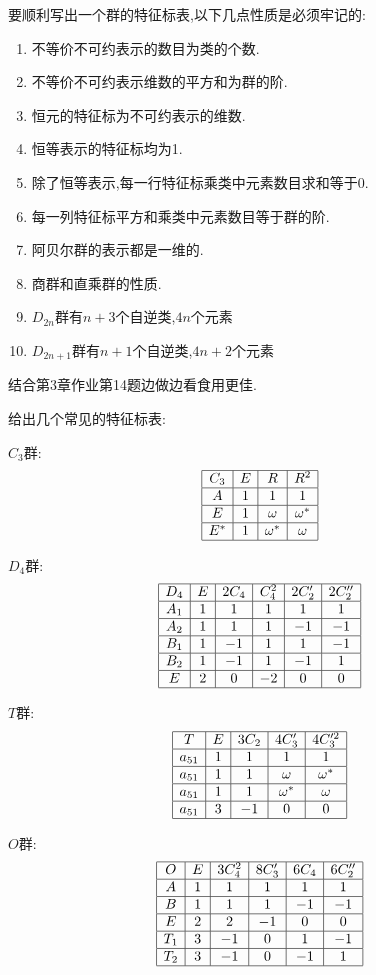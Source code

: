 \documentclass{ctexart}
\begin{document}
要顺利写出一个群的特征标表,以下几点性质是必须牢记的:
\begin{enumerate}
    \item 不等价不可约表示的数目为类的个数.
    \item 不等价不可约表示维数的平方和为群的阶.
    \item 恒元的特征标为不可约表示的维数.
    \item 恒等表示的特征标均为1.
    \item 除了恒等表示,每一行特征标乘类中元素数目求和等于0.
    \item 每一列特征标平方和乘类中元素数目等于群的阶.
    \item 阿贝尔群的表示都是一维的.
    \item 商群和直乘群的性质.
    \item $D_{2n}$群有$n+3$个自逆类,$4n$个元素
    \item $D_{2n+1}$群有$n+1$个自逆类,$4n+2$个元素
\end{enumerate}

结合第3章作业第14题边做边看食用更佳.

给出几个常见的特征标表:

$C_{3}$群:
\[
\begin{array}{|c|c|c|c|}
\hline
C_{3} & E & R & R^{2} \\
\hline
A & 1 & 1 & 1 \\
\hline
E & 1 & \omega & \omega^{*} \\
\hline
E^{*} & 1 & \omega^{*} & \omega \\
\hline
\end{array}
\]

$D_{4}$群:
\[
\begin{array}{|c|c|c|c|c|c|}
\hline
D_{4}  & E & 2C_{4} & C_{4}^{2} & 2C_{2}' & 2C_{2}'' \\
\hline
A_{1} &1&1&1&1&1\\
\hline
A_{2} &1&1&1&-1&-1\\
\hline
B_{1} &1&-1&1&1&-1\\
\hline
B_{2} &1&-1&1&-1&1\\
\hline
E     &2&0&-2&0&0\\
\hline
\end{array}
\]

$T$群:
\[
\begin{array}{|c|c|c|c|c|}
\hline
T&E&3C_{2}&4C_{3}'&4C_{3}'^{2}\\
\hline
a_{51} &1&1&1&1\\
\hline
a_{51} &1&1&\omega&\omega^{*}\\
\hline
a_{51} &1&1&\omega^{*}&\omega\\
\hline
a_{51} &3&-1&0&0\\
\hline

\end{array}
\]

$O$群:
\[
\begin{array}{|c|c|c|c|c|c|}
\hline
O&E&3C_{4}^{2}&8C_{3}'&6C_{4}&6C_{2}''\\
\hline
A&1&1&1&1&1\\
\hline
B&1&1&1&-1&-1\\
\hline
E&2&2&-1&0&0\\
\hline
T_{1}&3&-1&0&1&-1\\
\hline
T_{2}&3&-1&0&-1&1\\
\hline
\end{array}
\]
\end{document}
